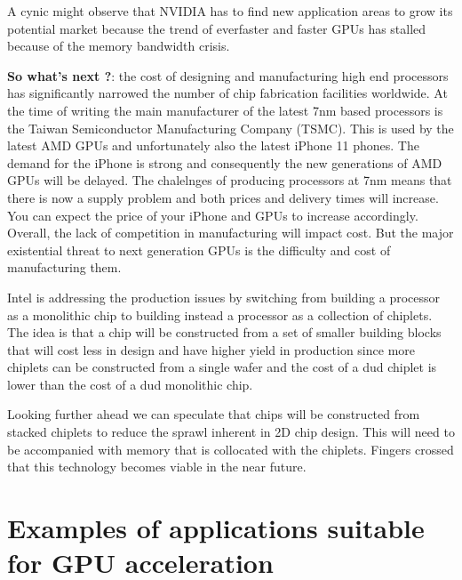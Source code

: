 A cynic might observe that NVIDIA has to find new application areas to grow its potential market because the trend of everfaster and faster GPUs has stalled because of the memory bandwidth crisis.

{\bf So what's next ?}: the cost of designing and manufacturing high end processors has significantly narrowed the number of chip fabrication facilities worldwide. At the time of writing the main manufacturer of the latest 7nm based processors is the Taiwan Semiconductor Manufacturing Company (TSMC). This is used by the latest AMD GPUs and unfortunately also the latest iPhone 11 phones. The demand for the iPhone is strong and consequently the new generations of AMD GPUs will be delayed. The chalelnges of producing processors at 7nm means that there is now a supply problem and both prices and delivery times will increase. You can expect the price of your iPhone and GPUs to increase accordingly. Overall, the lack of competition in manufacturing will impact cost. But the major existential threat to next generation GPUs is the difficulty and cost of manufacturing them. 

Intel is addressing the production issues by switching from building a processor as a monolithic chip to building instead a processor as a collection of chiplets. The idea is that a chip will be constructed from a set of smaller building blocks that will cost less in design and have higher yield in production since more chiplets can be constructed from a single wafer and the cost of a dud chiplet is lower than the cost of a dud monolithic chip. 

Looking further ahead we can speculate that chips will be constructed from stacked chiplets to reduce the sprawl inherent in 2D chip design. This will need to be accompanied with memory that is collocated with the chiplets. Fingers crossed that this technology becomes viable in the near future.




\section{Examples of applications suitable for GPU acceleration}





